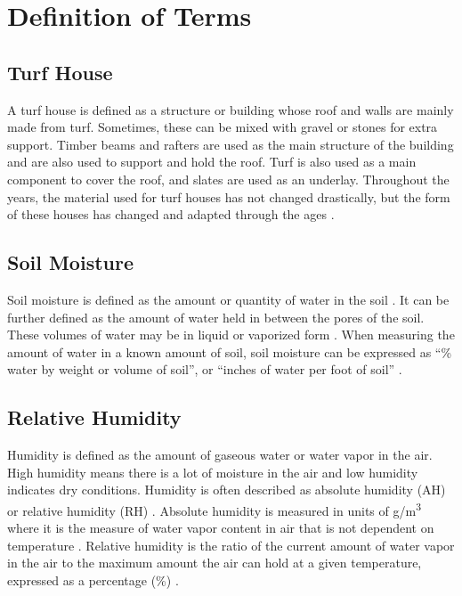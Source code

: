 \section{Definition of Terms}
\subsection{Turf House}

A turf house is defined as a structure or building whose roof and walls
are mainly made from turf. Sometimes, these can be mixed with gravel or
stones for extra support. Timber beams and rafters are used as the main
structure of the building and are also used to support and hold the
roof. Turf is also used as a main component to cover the roof, and
slates are used as an underlay. Throughout the years, the material used
for turf houses has not changed drastically, but the form of these
houses has changed and adapted through the ages \cite{ref14}\cite{ref15}.

\subsection{Soil Moisture}

Soil moisture is defined as the amount or quantity of water in the soil
\cite{ref16}\cite{ref17}. It can be further defined as the amount of water held
in between the pores of the soil. These volumes of water may be in
liquid or vaporized form \cite{ref18}. When measuring the amount of water in
a known amount of soil, soil moisture can be expressed as ``\% water by
weight or volume of soil'', or ``inches of water per foot of soil''
\cite{ref19}.

\subsection{Relative Humidity}

Humidity is defined as the amount of gaseous water or water vapor in the
air. High humidity means there is a lot of moisture in the air and low
humidity indicates dry conditions. Humidity is often described as
absolute humidity (AH) or relative humidity (RH) \cite{ref20}\cite{ref21}.
Absolute humidity is measured in units of g/m\textsuperscript{3} where
it is the measure of water vapor content in air that is not dependent on
temperature \cite{ref20}. Relative humidity is the ratio of the current
amount of water vapor in the air to the maximum amount the air can hold
at a given temperature, expressed as a percentage (\%) \cite{ref23}.

